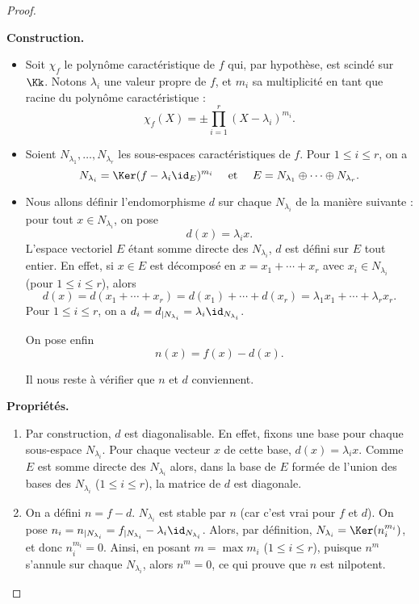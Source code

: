 \documentclass[12pt, class=report,crop=false]{standalone}
\begin{document}
\begin{proof}~

\textbf{Construction.}
\begin{itemize}
  \item Soit $\chi_f$ le polynôme caractéristique de $f$ qui, par hypothèse, est scindé sur $\Kk$.
 Notons $\lambda_i$ une valeur propre de $f$, et $m_i$ sa multiplicité en tant que racine du polynôme caractéristique :
$$\chi_f(X)=\pm\prod_{i=1}^r(X-\lambda_i)^{m_i}.$$

  \item Soient $N_{\lambda_1},\ldots, N_{\lambda_r}$ les sous-espaces caractéristiques de $f$. Pour $1\le i\le r$, on a 
$$N_{\lambda_i} = \Ker(f-\lambda_i\id_E)^{m_i}\quad  \text{ et }\quad 
E=N_{\lambda_1}\oplus\cdots\oplus N_{\lambda_r}.$$

  \item Nous allons définir l'endomorphisme $d$ sur chaque $N_{\lambda_i}$ de la manière suivante : pour tout $x\in N_{\lambda_i}$, on pose
$$d(x)=\lambda_i x.$$
L'espace vectoriel $E$ étant somme directe des $N_{\lambda_i}$, 
$d$ est défini sur $E$ tout entier. En effet, si $x \in E$ est décomposé en
 $x=x_1+\cdots+x_r$ avec $x_i\in N_{\lambda_i}$ (pour $1\le i\le r$), alors
 $$d(x) = d(x_1+\cdots+x_r) = d(x_1) + \cdots + d(x_r)
 = \lambda_1 x_1 + \cdots + \lambda_r x_r.$$
Pour $1\le i\le r$, on a  $d_i=d_{|N_{\lambda_i}}=\lambda_i\id_{N_{\lambda_i}}$. 

On pose enfin 
$$n(x)=f(x)-d(x).$$

Il nous reste à vérifier que $n$ et $d$ conviennent.
\end{itemize}

\medskip

\textbf{Propriétés.}
\begin{enumerate}
  \item Par construction, $d$ est diagonalisable. 
  En effet, fixons une base pour chaque sous-espace $N_{\lambda_i}$. Pour chaque vecteur $x$ de cette base,
  $d(x)=\lambda_i x$. Comme $E$ est somme directe des $N_{\lambda_i}$
  alors, dans la base de $E$ formée de l'union des bases des $N_{\lambda_i}$ ($1\le i\le r$), la matrice de $d$ est diagonale.

  \item On a défini $n=f-d$. $N_{\lambda_i}$ est stable par $n$ (car c'est vrai pour $f$  et $d$). 
  On pose $n_i=n_{|N_{\lambda_i}}=f_{|N_{\lambda_i}}-\lambda_i\id_{N_{\lambda_i}}$. 
  Alors, par définition, $N_{\lambda_i} = \Ker(n_i^{m_i})$, et donc $n_i^{m_i}=0$.
  Ainsi, en posant $m=\max {m_i}$ ($1\le i \le r$), puisque $n^m$ s'annule sur chaque $N_{\lambda_i}$, alors $n^m=0$, ce qui prouve que $n$ est nilpotent.


\end{enumerate}
\end{proof}
\end{document}
